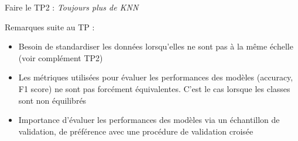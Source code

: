 \documentclass[10pt]{beamer}
\begin{document}
\begin{frame}
	\begin{center}
		Faire le TP2 : \textit{Toujours plus de KNN}
	\end{center}
	
	\vspace*{3em}
	\pause
	Remarques suite au TP :\\[1.5em]
	\begin{itemize}
		\item Besoin de standardiser les données lorsqu'elles ne sont pas à la même échelle (voir complément TP2)\\[1em]
		\item Les métriques utilisées pour évaluer les performances des modèles (accuracy, F1 score) ne sont pas forcément équivalentes. C'est le cas \eg lorsque les classes sont non équilibrés\\[1em]
		\item Importance d'évaluer les performances des modèles via un échantillon de validation, de préférence avec une procédure de validation croisée
	\end{itemize}
	
	\vspace*{5em}
%	
\end{frame}



%
%
%
\end{document}
